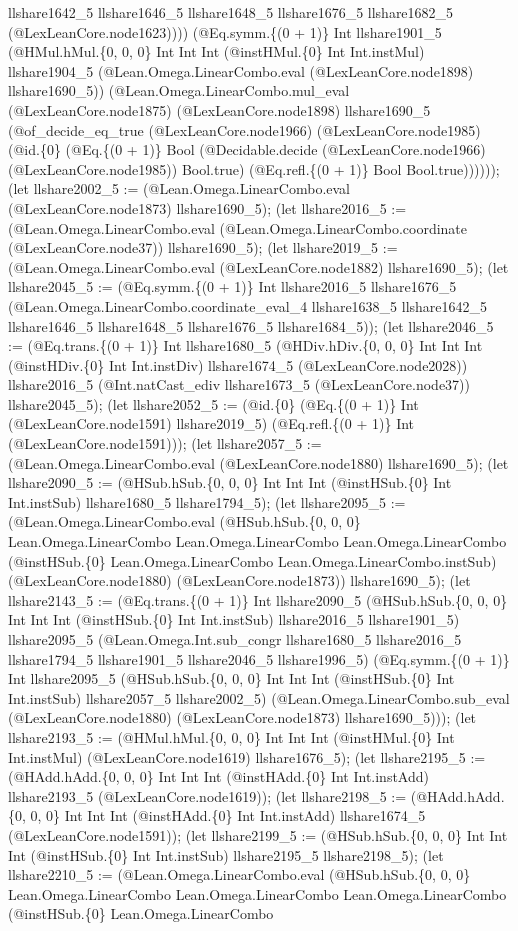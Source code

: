 \documentclass[11pt]{article}
\begin{document}
llshare1642\_5 llshare1646\_5 llshare1648\_5 llshare1676\_5 llshare1682\_5 (@LexLeanCore.node1623)))) (@Eq.symm.\{(0 + 1)\} Int llshare1901\_5 (@HMul.hMul.\{0, 0, 0\} Int Int Int (@instHMul.\{0\} Int Int.instMul) llshare1904\_5 (@Lean.Omega.LinearCombo.eval (@LexLeanCore.node1898) llshare1690\_5)) (@Lean.Omega.LinearCombo.mul\_eval (@LexLeanCore.node1875) (@LexLeanCore.node1898) llshare1690\_5 (@of\_decide\_eq\_true (@LexLeanCore.node1966) (@LexLeanCore.node1985) (@id.\{0\} (@Eq.\{(0 + 1)\} Bool (@Decidable.decide (@LexLeanCore.node1966) (@LexLeanCore.node1985)) Bool.true) (@Eq.refl.\{(0 + 1)\} Bool Bool.true)))))); (let llshare2002\_5 := (@Lean.Omega.LinearCombo.eval (@LexLeanCore.node1873) llshare1690\_5); (let llshare2016\_5 := (@Lean.Omega.LinearCombo.eval (@Lean.Omega.LinearCombo.coordinate (@LexLeanCore.node37)) llshare1690\_5); (let llshare2019\_5 := (@Lean.Omega.LinearCombo.eval (@LexLeanCore.node1882) llshare1690\_5); (let llshare2045\_5 := (@Eq.symm.\{(0 + 1)\} Int llshare2016\_5 llshare1676\_5 (@Lean.Omega.LinearCombo.coordinate\_eval\_4 llshare1638\_5 llshare1642\_5 llshare1646\_5 llshare1648\_5 llshare1676\_5 llshare1684\_5)); (let llshare2046\_5 := (@Eq.trans.\{(0 + 1)\} Int llshare1680\_5 (@HDiv.hDiv.\{0, 0, 0\} Int Int Int (@instHDiv.\{0\} Int Int.instDiv) llshare1674\_5 (@LexLeanCore.node2028)) llshare2016\_5 (@Int.natCast\_ediv llshare1673\_5 (@LexLeanCore.node37)) llshare2045\_5); (let llshare2052\_5 := (@id.\{0\} (@Eq.\{(0 + 1)\} Int (@LexLeanCore.node1591) llshare2019\_5) (@Eq.refl.\{(0 + 1)\} Int (@LexLeanCore.node1591))); (let llshare2057\_5 := (@Lean.Omega.LinearCombo.eval (@LexLeanCore.node1880) llshare1690\_5); (let llshare2090\_5 := (@HSub.hSub.\{0, 0, 0\} Int Int Int (@instHSub.\{0\} Int Int.instSub) llshare1680\_5 llshare1794\_5); (let llshare2095\_5 := (@Lean.Omega.LinearCombo.eval (@HSub.hSub.\{0, 0, 0\} Lean.Omega.LinearCombo Lean.Omega.LinearCombo Lean.Omega.LinearCombo (@instHSub.\{0\} Lean.Omega.LinearCombo Lean.Omega.LinearCombo.instSub) (@LexLeanCore.node1880) (@LexLeanCore.node1873)) llshare1690\_5); (let llshare2143\_5 := (@Eq.trans.\{(0 + 1)\} Int llshare2090\_5 (@HSub.hSub.\{0, 0, 0\} Int Int Int (@instHSub.\{0\} Int Int.instSub) llshare2016\_5 llshare1901\_5) llshare2095\_5 (@Lean.Omega.Int.sub\_congr llshare1680\_5 llshare2016\_5 llshare1794\_5 llshare1901\_5 llshare2046\_5 llshare1996\_5) (@Eq.symm.\{(0 + 1)\} Int llshare2095\_5 (@HSub.hSub.\{0, 0, 0\} Int Int Int (@instHSub.\{0\} Int Int.instSub) llshare2057\_5 llshare2002\_5) (@Lean.Omega.LinearCombo.sub\_eval (@LexLeanCore.node1880) (@LexLeanCore.node1873) llshare1690\_5))); (let llshare2193\_5 := (@HMul.hMul.\{0, 0, 0\} Int Int Int (@instHMul.\{0\} Int Int.instMul) (@LexLeanCore.node1619) llshare1676\_5); (let llshare2195\_5 := (@HAdd.hAdd.\{0, 0, 0\} Int Int Int (@instHAdd.\{0\} Int Int.instAdd) llshare2193\_5 (@LexLeanCore.node1619)); (let llshare2198\_5 := (@HAdd.hAdd.\{0, 0, 0\} Int Int Int (@instHAdd.\{0\} Int Int.instAdd) llshare1674\_5 (@LexLeanCore.node1591)); (let llshare2199\_5 := (@HSub.hSub.\{0, 0, 0\} Int Int Int (@instHSub.\{0\} Int Int.instSub) llshare2195\_5 llshare2198\_5); (let llshare2210\_5 := (@Lean.Omega.LinearCombo.eval (@HSub.hSub.\{0, 0, 0\} Lean.Omega.LinearCombo Lean.Omega.LinearCombo Lean.Omega.LinearCombo (@instHSub.\{0\} Lean.Omega.LinearCombo 
\end{document}
